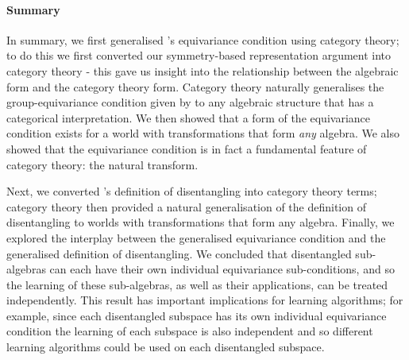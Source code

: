 \paragraph{Summary}
In summary, we first generalised \autocite{Higgins2018}'s equivariance condition using category theory; to do this we first converted our symmetry-based representation argument into category theory - this gave us insight into the relationship between the algebraic form and the category theory form.
Category theory naturally generalises the group-equivariance condition given by \autocite{Higgins2018} to any algebraic structure that has a categorical interpretation.
We then showed that a form of the equivariance condition exists for a world with transformations that form \textit{any} algebra.
We also showed that the equivariance condition is in fact a fundamental feature of category theory: the natural transform.

Next, we converted \autocite{Higgins2018}'s definition of disentangling into category theory terms; category theory then provided a natural generalisation of the definition of disentangling to worlds with transformations that form any algebra.
Finally, we explored the interplay between the generalised equivariance condition and the generalised definition of disentangling.
We concluded that disentangled sub-algebras can each have their own individual equivariance sub-conditions, and so the learning of these sub-algebras, as well as their applications, can be treated independently.
This result has important implications for learning algorithms; for example, since each disentangled subspace has its own individual equivariance condition the learning of each subspace is also independent and so different learning algorithms could be used on each disentangled subspace.

